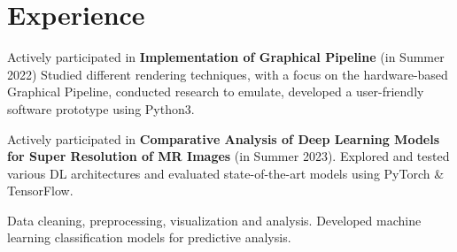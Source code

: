 \documentclass[]{resume}
\begin{document}


%
%

\begin{minipage}[t]{0.5\textwidth}


    \section{Experience}


    \vspace{\topsep} %
    \begin{tightemize}
        \sectionsep
        \item Actively participated in \textbf{Implementation of Graphical Pipeline} (in Summer 2022) Studied different rendering techniques, with a focus on the hardware-based Graphical Pipeline, conducted research to emulate, developed a user-friendly software prototype using Python3.
        \item Actively participated in \textbf{Comparative Analysis of Deep Learning Models for Super Resolution of MR Images} (in Summer 2023). Explored and tested various DL architectures and evaluated state-of-the-art models using PyTorch \& TensorFlow.
    \end{tightemize}


    \begin{tightemize}
        \sectionsep
        \item Data cleaning, preprocessing, visualization and analysis. Developed machine learning classification models for predictive analysis.
    \end{tightemize}


\end{minipage}
\end{document}
